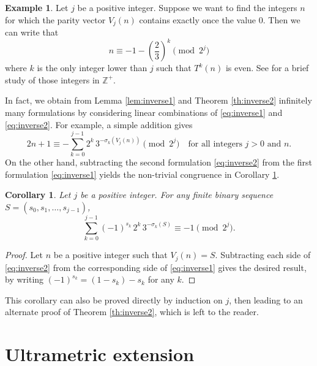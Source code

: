 \documentclass[12pt]{article}
\newtheorem{corollary}{Corollary}
\theoremstyle{definition}
\newtheorem{example}{Example}
\begin{document}
\begin{example} \label{ex:inverse_vector}
Let $j$ be a positive integer. Suppose we want to find the integers $n$ for which the parity vector $V_{j}(n)$ contains exactly once the value 0. Then we can write that
$$ n \equiv -1 - \left( \frac{2}{3}\right)^{k} \pmod{2^j} $$
where $k$ is the only integer lower than $j$ such that $T^{k}(n)$ is even. See \cite[\S 6]{Roz17} for a brief study of those integers in $\mathbb{Z^+}$.
\end{example}

In fact, we obtain from Lemma \ref{lem:inverse1} and Theorem \ref{th:inverse2} infinitely many formulations by considering linear combinations of \eqref{eq:inverse1} and \eqref{eq:inverse2}. For example, a simple addition gives 
$$ 2n+1 \equiv - \sum_{k=0}^{j-1} 2^{k} \, 3^{-\sigma_{k}(V_j(n))} \pmod{ 2^{j}} \quad \text{for all integers $j>0$ and $n$}.$$
On the other hand, subtracting  the second formulation \eqref{eq:inverse2} from the first formulation \eqref{eq:inverse1} yields the non-trivial congruence in Corollary \ref{cor:invariant}.

\begin{corollary}
\label{cor:invariant}
Let $j$ be a positive integer. For any finite binary sequence $S=\left( s_0, s_1, \ldots, s_{j-1} \right)$, 
\begin{equation}\label{eq:invariant}
\sum_{k=0}^{j-1} (-1)^{s_{k}} \, 2^{k} \, 3^{-\sigma_{k}(S)} \equiv -1 \pmod{ 2^{j}}.
\end{equation}
\end{corollary}

\begin{proof}
Let $n$ be a positive integer such that $V_j(n) = S$. Subtracting each side of \eqref{eq:inverse2} from the corresponding side of \eqref{eq:inverse1} gives the desired result, by writing 
$(-1)^{s_k} = (1-s_{k}) - s_k$ for any $k$.
\end{proof}

This corollary can also be proved directly by induction on $j$, then leading to an alternate proof of Theorem \ref{th:inverse2}, which is left to the reader.

\section{Ultrametric extension}
\label{sec:2-adic}
\end{document}
